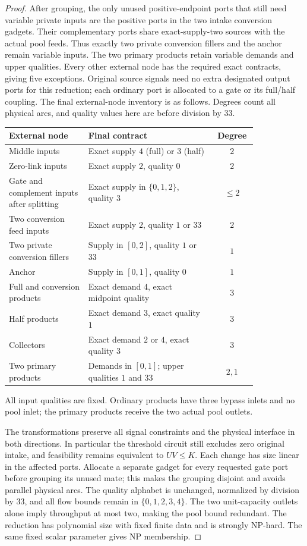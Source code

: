 \begin{proof}
After grouping, the only unused positive-endpoint ports that still
need variable private inputs are the positive ports in the two intake
conversion gadgets. Their complementary ports share exact-supply-two
sources with the actual pool feeds. Thus exactly two private conversion
fillers and the anchor remain variable inputs. The two primary products
retain variable demands and upper qualities. Every other external node
has the required exact contracts, giving five exceptions. Original source
signals need no extra designated output ports for this reduction; each
ordinary port is allocated to a gate or its full/half coupling.
The final external-node inventory is as follows. Degrees count all
physical arcs, and quality values here are before division by 33.
\begin{center}
\small
\begin{tabular}{p{0.32\linewidth}p{0.51\linewidth}c}
\toprule
External node & Final contract & Degree\\
\midrule
Middle inputs & Exact supply $4$ (full) or $3$ (half) & $2$\\
Zero-link inputs & Exact supply $2$, quality $0$ & $2$\\
Gate and complement inputs after splitting & Exact supply in
$\{0,1,2\}$, quality $3$ & $\le2$\\
Two conversion feed inputs & Exact supply $2$, quality $1$ or $33$ & $2$\\
Two private conversion fillers & Supply in $[0,2]$, quality $1$ or $33$ & $1$\\
Anchor & Supply in $[0,1]$, quality $0$ & $1$\\
Full and conversion products & Exact demand $4$, exact midpoint quality & $3$\\
Half products & Exact demand $3$, exact quality $1$ & $3$\\
Collectors & Exact demand $2$ or $4$, exact quality $3$ & $3$\\
Two primary products & Demands in $[0,1]$;
upper qualities $1$ and $33$ & $2,1$\\
\bottomrule
\end{tabular}
\end{center}
All input qualities are fixed. Ordinary products have three bypass inlets and no pool inlet; the primary products
receive the two actual pool outlets.

The transformations preserve all signal constraints and the physical
interface in both directions. In particular the threshold circuit still
excludes zero original intake, and feasibility remains equivalent to
$UV\le K$. Each change has size linear in the affected ports. Allocate a separate
gadget for every requested gate port before grouping its unused mate;
this makes the grouping disjoint and avoids parallel physical arcs. The
quality alphabet is unchanged, normalized by division by 33, and all
flow bounds remain in $\{0,1,2,3,4\}$. The two unit-capacity outlets
alone imply throughput at most two, making the pool bound redundant.
The reduction has polynomial size with fixed finite data and is strongly
NP-hard. The same fixed scalar parameter gives NP membership.
\end{proof}

